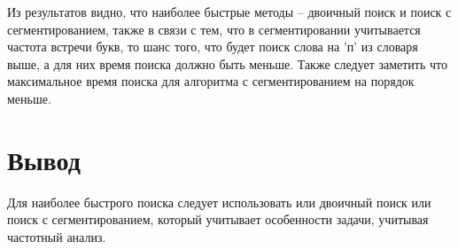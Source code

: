 Из результатов видно, что наиболее быстрые методы -- двоичный поиск и поиск с сегментированием, также в связи с тем, что в сегментировании учитывается частота встречи букв, то шанс того, что будет поиск слова на 'п' из словаря выше, а для них время поиска должно быть меньше. Также следует заметить что максимальное время поиска для алгоритма с сегментированием на порядок меньше.

\section{Вывод} 
\label{sec:resres}
Для наиболее быстрого поиска следует использовать или двоичный поиск или поиск с сегментированием, который учитывает особенности задачи, учитывая частотный анализ.
